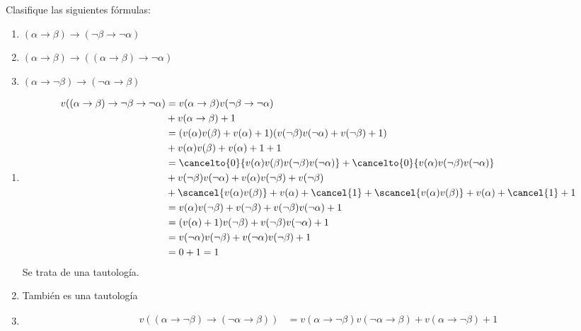 \begin{ejercicio}
    Clasifique las siguientes fórmulas:
    \begin{enumerate}
        \item $(\alpha\rightarrow\beta)\rightarrow(\lnot\beta\rightarrow\lnot\alpha)$
        \item $(\alpha\rightarrow\beta)\rightarrow((\alpha\rightarrow\beta)\rightarrow\lnot\alpha)$
        \item $(\alpha\rightarrow\lnot\beta)\rightarrow(\lnot\alpha\rightarrow\beta)$
    \end{enumerate}

    \begin{enumerate}
        \item 
            \begin{align*}
                v((\alpha\rightarrow\beta)\rightarrow\lnot\beta\rightarrow\lnot\alpha)  &= v(\alpha\rightarrow\beta)v(\lnot\beta\rightarrow\lnot\alpha)\\
                &+ v(\alpha\rightarrow\beta) + 1 \\
                &= (v(\alpha)v(\beta)+v(\alpha) + 1) (v(\lnot\beta)v(\lnot\alpha)+v(\lnot\beta)+1) \\
                &+ v(\alpha)v(\beta)+v(\alpha)+1+1 \\
                &= \cancelto{0}{v(\alpha)v(\beta)v(\lnot\beta)v(\lnot\alpha)}+\cancelto{0}{v(\alpha)v(\lnot\beta)v(\lnot\alpha)} \\
                &+ v(\lnot\beta)v(\lnot\alpha) + v(\alpha)v(\lnot\beta)+v(\lnot\beta) \\
                &+ \scancel{v(\alpha)v(\beta)}+v(\alpha)+\cancel{1}+ \scancel{v(\alpha)v(\beta)}+v(\alpha)+\cancel{1} +1\\
                &= v(\alpha)v(\lnot\beta)+v(\lnot\beta)+v(\lnot\beta)v(\lnot\alpha)+1 \\
                &= (v(\alpha)+1) v(\lnot\beta)+v(\lnot\beta)v(\lnot\alpha) + 1 \\
                &= v(\lnot\alpha)v(\lnot\beta) + v(\lnot\alpha)v(\lnot\beta) + 1 \\
                &= 0 + 1 = 1
            \end{align*}
            Se trata de una tautología.
        \item También es una tautología %
        \item 
            \begin{align*}
                v((\alpha\rightarrow\lnot\beta)\rightarrow(\lnot\alpha\rightarrow\beta)) &= v(\alpha\rightarrow\lnot\beta)v(\lnot\alpha\rightarrow\beta)+v(\alpha\rightarrow\lnot\beta) + 1 \\

\end{align*}
\end{enumerate}
\end{ejercicio}
